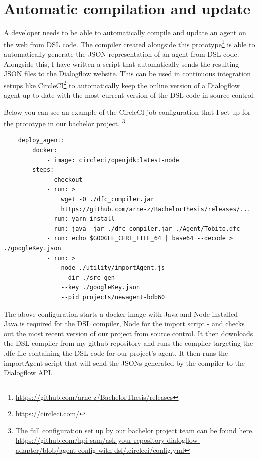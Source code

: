 \section{Automatic compilation and update}
A developer needs to be able to automatically compile and update an agent on the web from DSL code.
The compiler created alongside this prototype\footnote{\url{https://github.com/arne-z/BachelorThesis/releases}} is able to automatically generate the JSON representation of an agent from DSL code.
Alongside this, I have written a script that automatically sends the resulting JSON files to the Dialogflow website.
This can be used in continuous integration setups like CircleCI\footnote{\url{https://circleci.com/}} to automatically keep the online version of a Dialogflow agent up to date with the most current version of the DSL code in source control.

Below you can see an example of the CircleCI job configuration that I set up for the prototype in our bachelor project.
\footnote{The full configuration set up by our bachelor project team can be found here.\\
\url{https://github.com/hpi-sam/ask-your-repository-dialogflow-adapter/blob/agent-config-with-dsl/.circleci/config.yml}}

\begin{verbatim}
    deploy_agent:
        docker:
            - image: circleci/openjdk:latest-node
        steps:
            - checkout
            - run: > 
                wget -O ./dfc_compiler.jar
                https://github.com/arne-z/BachelorThesis/releases/...
            - run: yarn install
            - run: java -jar ./dfc_compiler.jar ./Agent/Tobito.dfc
            - run: echo $GOOGLE_CERT_FILE_64 | base64 --decode > ./googleKey.json
            - run: >
                node ./utility/importAgent.js 
                --dir ./src-gen 
                --key ./googleKey.json 
                --pid projects/newagent-bdb60
\end{verbatim}

The above configuration starts a docker image with Java and Node installed - Java is required for the DSL compiler, Node for the import script - and checks out the most recent version of our project from source control.
It then downloads the DSL compiler from my github repository and runs the compiler targeting the .dfc file containing the DSL code for our project's agent.
It then runs the importAgent script that will send the JSONs generated by the compiler to the Dialogflow API.

